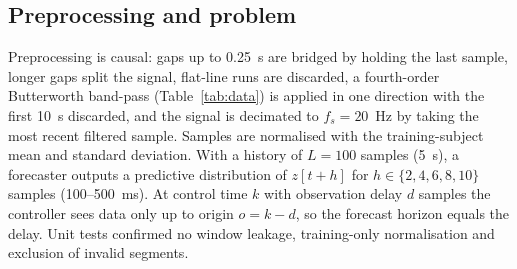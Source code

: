 \documentclass[conference]{IEEEtran}
\begin{document}
\subsection{Preprocessing and problem}
Preprocessing is causal: gaps up to 0.25~s are bridged by holding the last sample, longer gaps split the signal, flat-line runs are discarded, a fourth-order Butterworth band-pass (Table~\ref{tab:data}) is applied in one direction with the first 10~s discarded, and the signal is decimated to $f_s=20$~Hz by taking the most recent filtered sample. Samples are normalised with the training-subject mean and standard deviation. With a history of $L=100$ samples (5~s), a forecaster outputs a predictive distribution of $z[t+h]$ for $h\in\{2,4,6,8,10\}$ samples (100--500~ms). At control time $k$ with observation delay $d$ samples the controller sees data only up to origin $o=k-d$, so the forecast horizon equals the delay. Unit tests confirmed no window leakage, training-only normalisation and exclusion of invalid segments.
\end{document}
